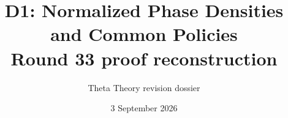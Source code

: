 \documentclass[11pt]{article}
\title{D1: Normalized Phase Densities and Common Policies\\\large Round 33 proof reconstruction}
\author{Theta Theory revision dossier}
\date{3 September 2026}
\begin{document}
\maketitle
\reviewnote

\end{document}

